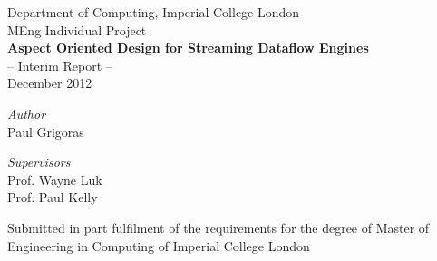 \begin{titlepage}

\begin{center}

{\Large Department of Computing, Imperial College London}
\HRule \\[0.4cm]
{\Large MEng Individual Project} \\ [5cm]

{\huge \bfseries Aspect Oriented Design for Streaming Dataflow Engines}\\[0.5cm]
{\Large -- Interim Report --}\\[0.5cm]
{\Large December 2012} \\ [3cm]

\begin{minipage}[t]{0.4\textwidth}
\begin{flushleft} \large
\emph{Author} \\[0.5cm]
{Paul Grigoras} \\[0.5cm]

\end{flushleft}
\end{minipage}
\begin{minipage}[t]{0.4\textwidth}
\begin{flushright} \large
\emph{Supervisors} \\[0.5cm]
Prof. Wayne Luk \\[0.5cm]
Prof. Paul Kelly 
\end{flushright}
\end{minipage}

\vfill

\begin{minipage}{0.7\textwidth}
\begin{center}
Submitted in part fulfilment of the requirements for the degree of
Master of Engineering in Computing of Imperial College London
\end{center}
\end{minipage}

\end{center}
\end{titlepage}

